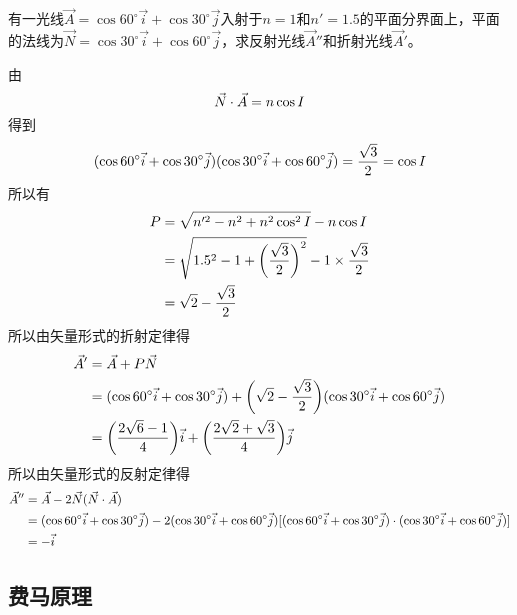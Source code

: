 \documentclass[cn,10pt,chinesefont=founder,math=mtpro2,cite=super,toc=onecol,twoside,openany]{elegantbook}
\begin{document}
\begin{problem}
	有一光线$\vec{A}=\cos 60^{\circ}\vec{i}+\cos 30^{\circ}\vec{j}$入射于$n=1$和$n'=1.5$的平面分界面上，平面的法线为$\vec{N}=\cos 30^{\circ}\vec{i}+\cos 60^{\circ}\vec{j}$，求反射光线$\vec{A}''$和折射光线$\vec{A}'$。
\end{problem}
\begin{solution}
	由
	\begin{equation}
	\vec{N}\cdot\vec{A}=n\cos I\notag
	\end{equation}
	得到
	\begin{equation}
	(\cos 60^{\circ}\vec{i}+\cos 30^{\circ}\vec{j})(\cos 30^{\circ}\vec{i}+\cos 60^{\circ}\vec{j})=\frac{\sqrt{3}}{2}=\cos I\notag
	\end{equation}
	所以有
	\begin{equation}
	\begin{aligned}
	P&=\sqrt{n'^2-n^2+n^2\cos^2 I}-n\cos I\\
	&=\sqrt{1.5^2-1+\bigg(\frac{\sqrt{3}}{2}\bigg)^2}-1\times\frac{\sqrt{3}}{2}\\
	&=\sqrt{2}-\frac{\sqrt{3}}{2}\notag
	\end{aligned}
	\end{equation}
	所以由矢量形式的折射定律得
	\begin{equation}
	\begin{aligned}
	\vec{A}'&=\vec{A}+P\vec{N}\\
	&=(\cos 60^{\circ}\vec{i}+\cos 30^{\circ}\vec{j})+\bigg(\sqrt{2}-\frac{\sqrt{3}}{2}\bigg)(\cos 30^{\circ}\vec{i}+\cos 60^{\circ}\vec{j})\\
	&=\bigg(\frac{2\sqrt{6}-1}{4}\bigg)\vec{i}+\bigg(\frac{2\sqrt{2}+\sqrt{3}}{4}\bigg)\vec{j}\notag
	\end{aligned}
	\end{equation}
	所以由矢量形式的反射定律得
	\begin{equation}
	\begin{aligned}
	\vec{A}''&=\vec{A}-2\vec{N}(\vec{N}\cdot\vec{A})\\
	&=(\cos 60^{\circ}\vec{i}+\cos 30^{\circ}\vec{j})-2(\cos 30^{\circ}\vec{i}+\cos 60^{\circ}\vec{j})[(\cos 60^{\circ}\vec{i}+\cos 30^{\circ}\vec{j})\cdot(\cos 30^{\circ}\vec{i}+\cos 60^{\circ}\vec{j})]\\
	&=-\vec{i}\notag
	\end{aligned}
	\end{equation}
\end{solution}

\subsection{费马原理}
\end{document}
